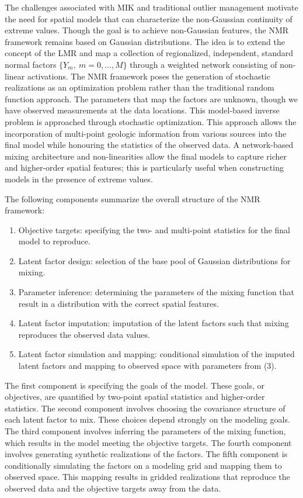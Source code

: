 The challenges associated with \gls{MIK} and traditional outlier management motivate the need for spatial models that can characterize the non-Gaussian continuity of extreme values. Though the goal is to achieve non-Gaussian features, the \gls{NMR} framework remains based on Gaussian distributions. The idea is to extend the concept of the \gls{LMR} and map a collection of regionalized, independent, standard normal factors $\{ Y_{m}, \ m = 0, \dots, M\}$ through a weighted network consisting of non-linear activations. The \gls{NMR} framework poses the generation of stochastic realizations as an optimization problem rather than the traditional random function approach. The parameters that map the factors are unknown, though we have observed measurements at the data locations. This model-based inverse problem is approached through stochastic optimization. This approach allows the incorporation of multi-point geologic information from various sources into the final model while honouring the statistics of the observed data. A network-based mixing architecture and non-linearities allow the final models to capture richer and higher-order spatial features; this is particularly useful when constructing models in the presence of extreme values.

The following components summarize the overall structure of the \gls{NMR} framework:
\begin{enumerate}[noitemsep]
    \item Objective targets: specifying the two- and multi-point statistics for the final model to reproduce.
    \item Latent factor design: selection of the base pool of Gaussian distributions for mixing.
    \item Parameter inference: determining the parameters of the mixing function that result in a distribution with the correct spatial features.
    \item Latent factor imputation: imputation of the latent factors such that mixing reproduces the observed data values.
    \item Latent factor simulation and mapping: conditional simulation of the imputed latent factors and mapping to observed space with parameters from (3).
\end{enumerate}

The first component is specifying the goals of the model. These goals, or objectives, are quantified by two-point spatial statistics and higher-order statistics. The second component involves choosing the covariance structure of each latent factor to mix. These choices depend strongly on the modeling goals. The third component involves inferring the parameters of the mixing function, which results in the model meeting the objective targets. The fourth component involves generating synthetic realizations of the factors. The fifth component is conditionally simulating the factors on a modeling grid and mapping them to observed space. This mapping results in gridded realizations that reproduce the observed data and the objective targets away from the data.

